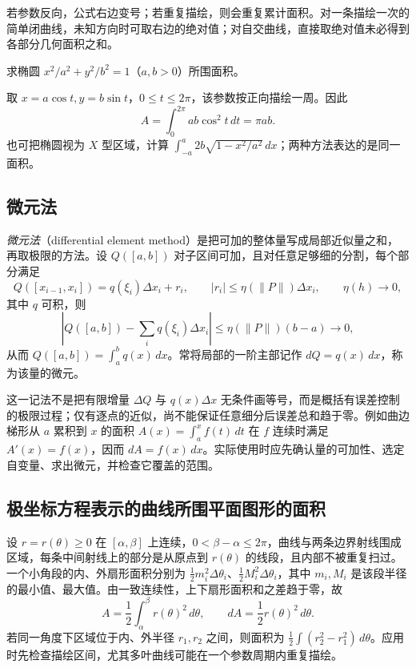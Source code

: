 若参数反向，公式右边变号；若重复描绘，则会重复累计面积。对一条描绘一次的简单闭曲线，未知方向时可取右边的绝对值；对自交曲线，直接取绝对值未必得到各部分几何面积之和。

\begin{example}
\label{ex:ellipse-area-by-parameter}
求椭圆 $x^2/a^2+y^2/b^2=1$（$a,b>0$）所围面积。
\end{example}
\begin{solve}
取 $x=a\cos t,y=b\sin t$，$0\leq t\leq2\pi$，该参数按正向描绘一周。因此
\[
    A=\int_0^{2\pi}ab\cos^2t\,dt=\pi ab.
\]
也可把椭圆视为 $X$ 型区域，计算 $\int_{-a}^a2b\sqrt{1-x^2/a^2}\,dx$；两种方法表达的是同一面积。
\end{solve}

\subsection{微元法}
\label{subsec:differential-element-method}

\emph{微元法}（differential element method）是把可加的整体量写成局部近似量之和，再取极限的方法。设 $Q([a,b])$ 对子区间可加，且对任意足够细的分割，每个部分满足
\[
    Q([x_{i-1},x_i])=q(\xi_i)\Delta x_i+r_i,\qquad
    |r_i|\leq\eta(\|P\|)\Delta x_i,\qquad \eta(h)\to0,
\]
其中 $q$ 可积，则
\[
    \left|Q([a,b])-\sum_iq(\xi_i)\Delta x_i\right|
    \leq\eta(\|P\|)(b-a)\longrightarrow0,
\]
从而 $Q([a,b])=\int_a^bq(x)\,dx$。常将局部的一阶主部记作 $dQ=q(x)\,dx$，称为该量的微元。

这一记法不是把有限增量 $\Delta Q$ 与 $q(x)\Delta x$ 无条件画等号，而是概括有误差控制的极限过程；仅有逐点的近似，尚不能保证任意细分后误差总和趋于零。例如曲边梯形从 $a$ 累积到 $x$ 的面积 $A(x)=\int_a^xf(t)\,dt$ 在 $f$ 连续时满足 $A'(x)=f(x)$，因而 $dA=f(x)\,dx$。实际使用时应先确认量的可加性、选定自变量、求出微元，并检查它覆盖的范围。

\subsection{极坐标方程表示的曲线所围平面图形的面积}
\label{subsec:plane-areas-enclosed-by-polar-curves}

设 $r=r(\theta)\geq0$ 在 $[\alpha,\beta]$ 上连续，$0<\beta-\alpha\leq2\pi$，曲线与两条边界射线围成区域，每条中间射线上的部分是从原点到 $r(\theta)$ 的线段，且内部不被重复扫过。一个小角段的内、外扇形面积分别为 $\frac12m_i^2\Delta\theta_i$、$\frac12M_i^2\Delta\theta_i$，其中 $m_i,M_i$ 是该段半径的最小值、最大值。由一致连续性，上下扇形面积和之差趋于零，故
\begin{equation}
    A=\frac12\int_\alpha^\beta r(\theta)^2\,d\theta,
    \qquad dA=\frac12r(\theta)^2\,d\theta.
    \label{eq:polar-area}
\end{equation}
若同一角度下区域位于内、外半径 $r_1,r_2$ 之间，则面积为 $\frac12\int(r_2^2-r_1^2)\,d\theta$。应用时先检查描绘区间，尤其多叶曲线可能在一个参数周期内重复描绘。

